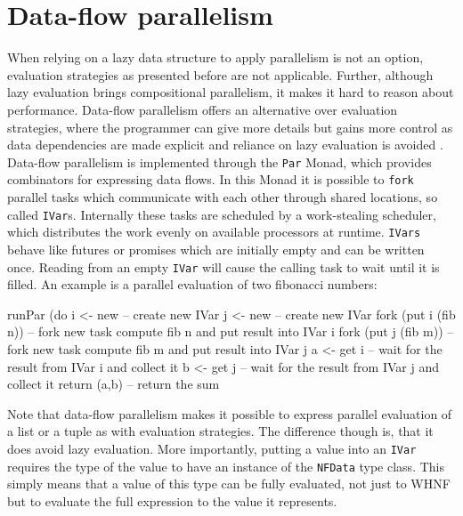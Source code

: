 \section{Data-flow parallelism}
When relying on a lazy data structure to apply parallelism is not an option, evaluation strategies as presented before are not applicable. Further, although lazy evaluation brings compositional parallelism, it makes it hard to reason about performance. Data-flow parallelism offers an alternative over evaluation strategies, where the programmer can give more details but gains more control as data dependencies are made explicit and reliance on lazy evaluation is avoided \cite{marlow_monad_2011}.
Data-flow parallelism is implemented through the \texttt{Par} Monad, which provides combinators for expressing data flows. In this Monad it is possible to \texttt{fork} parallel tasks which communicate with each other through shared locations, so called \texttt{IVar}s. Internally these tasks are scheduled by a work-stealing scheduler, which distributes the work evenly on available processors at runtime. \texttt{IVars} behave like futures or promises which are initially empty and can be written once. Reading from an empty \texttt{IVar} will cause the calling task to wait until it is filled. An example is a parallel evaluation of two fibonacci numbers:

\begin{HaskellCode}
runPar (do
  i <- new             -- create new IVar
  j <- new             -- create new IVar
  fork (put i (fib n)) -- fork new task compute fib n and put result into IVar i
  fork (put j (fib m)) -- fork new task compute fib m and put result into IVar j
  a <- get i           -- wait for the result from IVar i and collect it
  b <- get j           -- wait for the result from IVar j and collect it
  return (a,b)         -- return the sum
\end{HaskellCode}

Note that data-flow parallelism makes it possible to express parallel evaluation of a list or a tuple as with evaluation strategies. The difference though is, that it does avoid lazy evaluation. More importantly, putting a value into an \texttt{IVar} requires the type of the value to have an instance of the \texttt{NFData} type class. This simply means that a value of this type can be fully evaluated, not just to WHNF but to evaluate the full expression to the value it represents.

